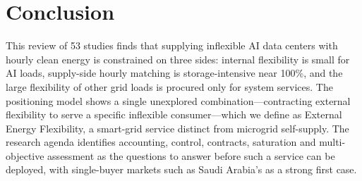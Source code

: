 \documentclass[conference]{IEEEtran}
\begin{document}
\section{Conclusion}
This review of 53 studies finds that supplying inflexible AI data centers with hourly clean energy is constrained on three sides: internal flexibility is small for AI loads, supply-side hourly matching is storage-intensive near 100\%, and the large flexibility of other grid loads is procured only for system services. The positioning model shows a single unexplored combination---contracting external flexibility to serve a specific inflexible consumer---which we define as External Energy Flexibility, a smart-grid service distinct from microgrid self-supply. The research agenda identifies accounting, control, contracts, saturation and multi-objective assessment as the questions to answer before such a service can be deployed, with single-buyer markets such as Saudi Arabia's as a strong first case.



\end{document}
